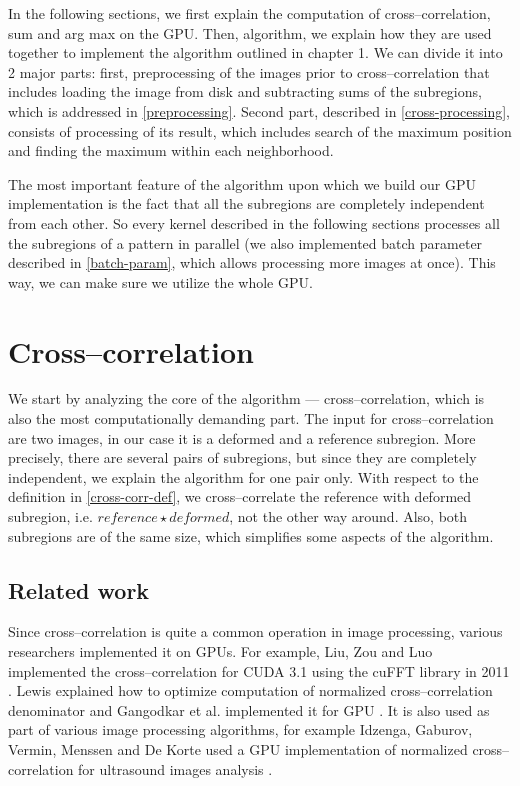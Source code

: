 In the following sections, we first explain the computation of cross--cor\-re\-la\-ti\-on, sum and arg max on the GPU. Then, algorithm, we explain how they are used together to implement the algorithm outlined in chapter 1. We can divide it into 2 major parts: first, preprocessing of the images prior to cross--correlation that includes loading the image from disk and subtracting sums of the subregions, which is addressed in \cref{preprocessing}. Second part, described in \cref{cross-processing}, consists of processing of its result, which includes search of the maximum position and finding the maximum within each neighborhood.

The most important feature of the algorithm upon which we build our GPU implementation is the fact that all the subregions are completely independent from each other. So every kernel described in the following sections processes all the subregions of a pattern in parallel (we also implemented batch parameter described in \cref{batch-param}, which allows processing more images at once). This way, we can make sure we utilize the whole GPU. 

\section{Cross--correlation}
We start by analyzing the core of the algorithm --- cross--correlation, which is also the most computationally demanding part. The input for cross--correlation are two images, in our case it is a deformed and a reference subregion. More precisely, there are several pairs of subregions, but since they are completely independent, we explain the algorithm for one pair only. With respect to the definition in \cref{cross-corr-def}, we cross--correlate the reference with deformed subregion, i.e. $reference \star deformed$, not the other way around. Also, both subregions are of the same size, which simplifies some aspects of the algorithm.

\subsection{Related work}

Since cross--correlation is quite a common operation in image processing, various researchers implemented it on GPUs. For example, Liu, Zou and Luo implemented the cross--correlation for CUDA 3.1 using the cuFFT library in 2011 \cite{liu2011gpu}. Lewis explained how to optimize computation of normalized cross--correlation denominator \cite{lewisfast} and Gangodkar et al. implemented it for GPU \cite{gandokar2012fastNCCGPU}. It is also used as part of various image processing algorithms, for example Idzenga, Gaburov, Vermin, Menssen and De Korte used a GPU implementation of normalized cross--correlation for ultrasound images analysis \cite{Idzenga2014Ultrasonics}.

